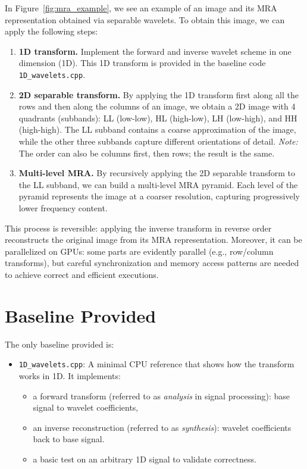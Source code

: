 \documentclass[11pt]{article}
\newcommand{\code}[1]{\texttt{#1}}
\newcommand{\term}[1]{\textbf{#1}}
\begin{document}
In Figure~\ref{fig:mra_example}, we see an example of an image and its MRA representation obtained via separable wavelets.
To obtain this image, we can apply the following steps:
\begin{enumerate}[leftmargin=1.5em]
  \item \term{1D transform.} Implement the forward and inverse wavelet scheme in one dimension (1D). This 1D transform is provided in the baseline code \code{1D\_wavelets.cpp}.
  \item \term{2D separable transform.} By applying the 1D transform first along all the rows and then along the columns of an image, we obtain a 2D image with 4 quadrants (subbands): \textsf{LL} (low-low), \textsf{HL} (high-low), \textsf{LH} (low-high), and \textsf{HH} (high-high).
        The \textsf{LL} subband contains a coarse approximation of the image, while the other three subbands capture different orientations of detail.
        \textit{Note:} The order can also be columns first, then rows; the result is the same.
  \item \term{Multi-level MRA.} By recursively applying the 2D separable transform to the \textsf{LL} subband, we can build a multi-level MRA pyramid.
        Each level of the pyramid represents the image at a coarser resolution, capturing progressively lower frequency content.
\end{enumerate}

\vspace{0.5em}

This process is reversible: applying the inverse transform in reverse order reconstructs the original image from its MRA representation.
Moreover, it can be parallelized on GPUs: some parts are evidently parallel (e.g., row/column transforms), but careful synchronization and memory access patterns are needed to achieve correct and efficient executions.

\section*{Baseline Provided}

The only baseline provided is:

\begin{itemize}
  \item \code{1D\_wavelets.cpp}: A minimal CPU reference that shows how the transform works in 1D.
  It implements:
  \begin{itemize}
    \item a forward transform (referred to as \emph{analysis} in signal processing): base signal to wavelet coefficients,
    \item an inverse reconstruction (referred to as \emph{synthesis}): wavelet coefficients back to base signal.
    \item a basic test on an arbitrary 1D signal to validate correctness.
  \end{itemize}
\end{itemize}
\end{document}
